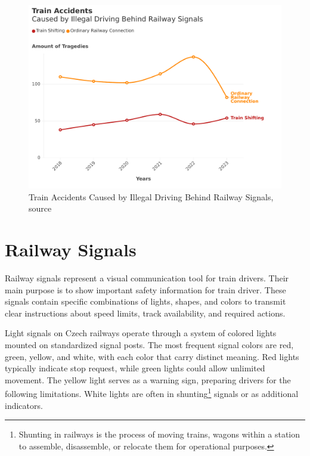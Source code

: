 \documentclass[english, ing, kiv, he, iso690alph, pdf, viewonly]{fasthesis}
\begin{document}
\begin{figure}[!ht]

    \includegraphics[width=1\linewidth]{Train Accidents.pdf}
    \caption{Train Accidents Caused by Illegal Driving Behind Railway Signals, source \cite{di.gov.cz}}

\end{figure}


\section{Railway Signals}
Railway signals represent a visual communication tool for train drivers. Their main purpose is to show important safety information for train driver. These signals contain specific combinations of lights, shapes, and colors to transmit clear instructions about speed limits, track availability, and required actions. 

Light signals on Czech railways operate through a system of colored lights mounted on standardized signal posts. The most frequent signal colors are red, green, yellow, and white, with each color that carry distinct meaning. Red lights typically indicate stop request, while green lights could allow unlimited movement. The yellow light serves as a warning sign, preparing drivers for the following limitations. White lights are often in shunting\footnote{Shunting in railways is the process of moving trains, wagons within a station to assemble, disassemble, or relocate them for operational purposes.} signals or as additional indicators. 
\end{document}
